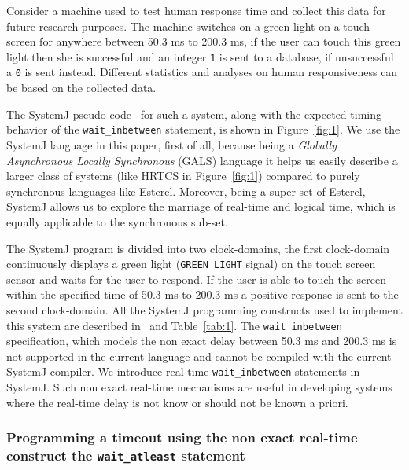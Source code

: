 Consider a machine used to test human response time and collect this
data for future research purposes. The machine switches on a green light
on a touch screen for anywhere between 50.3 ms to 200.3 ms, if the user
can touch this green light then she is successful and an integer
\texttt{1} is sent to a database, if unsuccessful a \texttt{0} is sent
instead. Different statistics and analyses on human responsiveness can
be based on the collected data.

The SystemJ pseudo-code~\cite{amal10} for such a system, along with the
expected timing behavior of the \texttt{wait\_inbetween} statement, is
shown in Figure~\ref{fig:1}. We use the SystemJ language in this paper,
first of all, because being a \textit{Globally Asynchronous Locally
  Synchronous} (GALS) language it helps us easily describe a larger
class of systems (like HRTCS in Figure~\ref{fig:1}) compared to purely
synchronous languages like Esterel. Moreover, being a super-set of
Esterel, SystemJ allows us to explore the marriage of real-time and
logical time, which is equally applicable to the synchronous sub-set.

The SystemJ program is divided into two clock-domains, the first
clock-domain continuously displays a green light (\texttt{GREEN\_LIGHT}
signal) on the touch screen sensor and waits for the user to respond. If
the user is able to touch the screen within the specified time of 50.3
ms to 200.3 ms a positive response is sent to the second
clock-domain. All the SystemJ programming constructs used to implement
this system are described in~\cite{amal10} and Table~\ref{tab:1}. The
\texttt{wait\_inbetween} specification, which models the non exact delay
between 50.3 ms and 200.3 ms is not supported in the current language
and cannot be compiled with the current SystemJ compiler. We introduce
real-time \texttt{wait\_inbetween} statements in SystemJ. Such non exact
real-time mechanisms are useful in developing systems where the
real-time delay is not know or should not be known a priori.

\subsubsection{Programming a timeout using the non exact real-time
  construct the \texttt{wait\_atleast} statement}
\label{sec:progr-time-using}

